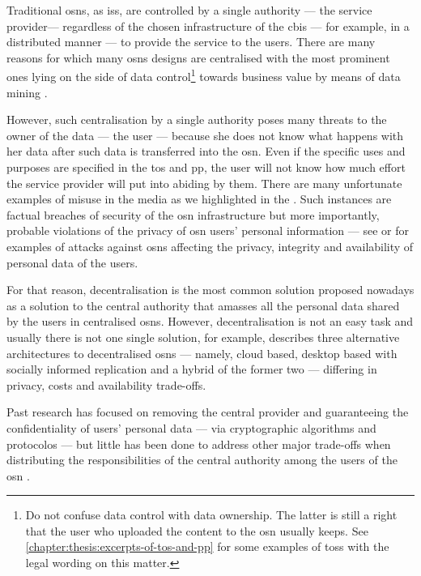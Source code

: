 Traditional \acp{osn}, as \acp{is}, are controlled by a single authority --- the 
service provider--- regardless of the chosen infrastructure of the \ac{cbis} --- 
for example, in a distributed manner --- to provide the service to the users. There 
are many reasons for which many \acp{osn} designs are centralised with the most 
prominent ones lying on the side of data control\footnote{Do not confuse data control 
with data ownership. The latter is still a right that the user who uploaded the content 
to the \ac{osn} usually keeps. See \cref{chapter:thesis:excerpts-of-tos-and-pp} for some 
examples of \acp{tos} with the legal wording on this matter.} towards business value 
by means of data mining \cite{DomingosR01}.

However, such centralisation by a single authority poses many threats to the owner 
of the data --- the user --- because she does not know what happens with her data 
after such data is transferred into the \ac{osn}. Even if the specific uses and 
purposes are specified in the \ac{tos} and \ac{pp}, the user will not know how much 
effort the service provider will put into abiding by them. There are many unfortunate 
examples of misuse in the media as we highlighted in the .
Such instances are factual breaches of security of the \ac{osn} infrastructure but 
more importantly, probable violations of the privacy of \ac{osn} users' personal 
information --- see \cite{CutilloMS10} or \cite{GaoHHWC11} for examples of attacks 
against \acp{osn} affecting the privacy, integrity and availability of personal 
data of the users.

For that reason, decentralisation is the most common solution proposed nowadays 
as a solution to the central authority that amasses all the personal data shared 
by the users in centralised \acp{osn}. However, decentralisation is not an easy 
task and usually there is not one single solution, for example, \cite{ShakimovVCC09} 
describes three alternative architectures to decentralised \acp{osn} --- namely, 
cloud based, desktop based with socially informed replication and a hybrid of the 
former two --- differing in privacy, costs and availability trade-offs. 

Past research has focused on removing the central provider and guaranteeing the 
confidentiality of users' personal data --- via cryptographic algorithms and protocolos 
--- but little has been done to address other major trade-offs when distributing 
the responsibilities of the central authority among the users of the \ac{osn} \cite{GreschbachKB12}
.%

